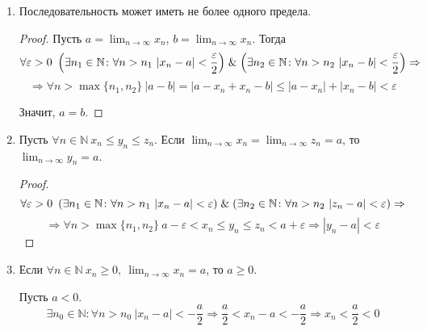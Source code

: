 \begin{enumerate}
	\item Последовательность может иметь не более одного предела.
	\begin{proof}
	Пусть $\displaystyle a = \lim_{n \to \infty} x_n$, $\displaystyle b = \lim_{n \to \infty} x_n$.
	Тогда
	\begin{equation*}
	\forall \varepsilon > 0 \
	\left( \exists n_1 \in \mathbb N \colon \forall n > n_1 \ |x_n - a| < \frac\varepsilon2 \right) \mathrel{\&}
	\left( \exists n_2 \in \mathbb N \colon \forall n > n_2 \ |x_n - b| < \frac\varepsilon2 \right) \Rightarrow
	\end{equation*}
	\begin{equation*}
	\Rightarrow \forall n > \max \{ n_1, n_2 \} \ |a - b| = |a - x_n + x_n - b| \leqslant |a - x_n| + |x_n - b| < \varepsilon
	\end{equation*}
	
	Значит, $a = b$.
	\end{proof}
	
	\item \begin{theorem}
	Пусть $\forall n \in \mathbb N \ x_n \leqslant y_n \leqslant z_n$.
	Если $\displaystyle \lim_{n \to \infty} x_n = \lim_{n \to \infty} z_n = a$, то $\displaystyle \lim_{n \to \infty} y_n = a$.
	\end{theorem}
	\begin{proof}
	\begin{equation*}
	\forall \varepsilon > 0 \
	\left( \exists n_1 \in \mathbb N \colon \forall n > n_1 \ |x_n - a| < \varepsilon \right) \mathrel{\&}
	\left( \exists n_2 \in \mathbb N \colon \forall n > n_2 \ |z_n - a| < \varepsilon \right) \Rightarrow
	\end{equation*}
	\begin{equation*}
	\Rightarrow \forall n > \max \{ n_1, n_2 \} \ a - \varepsilon < x_n \leqslant y_n \leqslant z_n < a + \varepsilon \Rightarrow |y_n - a| < \varepsilon
	\end{equation*}
	\end{proof}
	
	\item Если $\displaystyle \forall n \in \mathbb N \ x_n \geqslant 0, \ \lim_{n \to \infty} x_n = a$, то $a \geqslant 0$.
	\begin{proofcontra}
	Пусть $a < 0$.
	\begin{equation*}
	\exists n_0 \in \mathbb N \colon \forall n > n_0 \ |x_n - a| < -\frac{a}2 \Rightarrow
	\frac{a}2 < x_n - a < -\frac{a}2 \Rightarrow
	x_n < \frac{a}2 < 0
	\end{equation*}
	

\end{proofcontra}
\end{enumerate}
